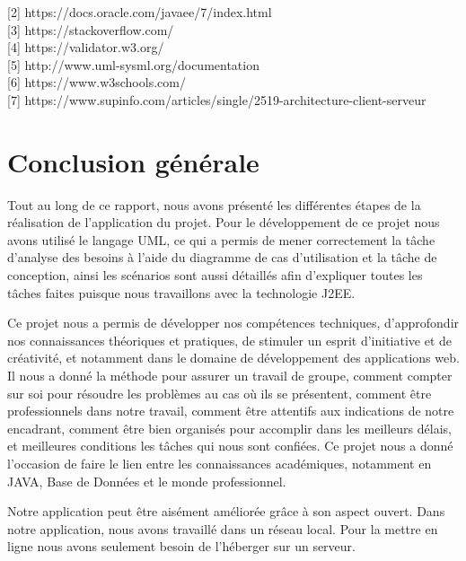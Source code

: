 \documentclass[11.5pt]{report}
\begin{document}
[2]     https://docs.oracle.com/javaee/7/index.html\\

[3]    https://stackoverflow.com/ \\

[4]    https://validator.w3.org/ \\

[5]   http://www.uml-sysml.org/documentation \\

[6]    https://www.w3schools.com/\\

[7]     https://www.supinfo.com/articles/single/2519-architecture-client-serveur \\  	
\chapter*{Conclusion générale}
Tout au long de ce rapport, nous avons présenté les différentes étapes de la réalisation de l’application du projet. Pour le développement de ce projet nous avons 
utilisé le langage UML, ce qui a permis de mener correctement la tâche d’analyse des besoins à l’aide du diagramme de cas d’utilisation et la tâche de conception, ainsi les scénarios sont aussi détaillés afin d’expliquer toutes les tâches faites puisque nous travaillons avec la technologie J2EE.

Ce projet nous a permis de développer nos compétences techniques, d’approfondir nos connaissances théoriques et pratiques, de stimuler un esprit d’initiative et de créativité, et notamment dans le domaine de développement des applications web. Il nous a donné la méthode pour assurer un travail de groupe, comment compter sur soi pour résoudre les problèmes au cas où ils se présentent, comment être professionnels dans notre travail, comment être attentifs aux indications de notre encadrant, comment être bien organisés pour accomplir dans les meilleurs délais, et meilleures conditions les tâches qui nous sont confiées. Ce projet nous a donné l’occasion de faire le lien entre les connaissances académiques, notamment en JAVA, Base de Données et le monde professionnel.

Notre application peut être aisément améliorée grâce à son aspect ouvert. Dans notre application, nous avons travaillé dans un réseau local. Pour la mettre en ligne nous avons seulement besoin de l’héberger sur un serveur.
\end{document}
